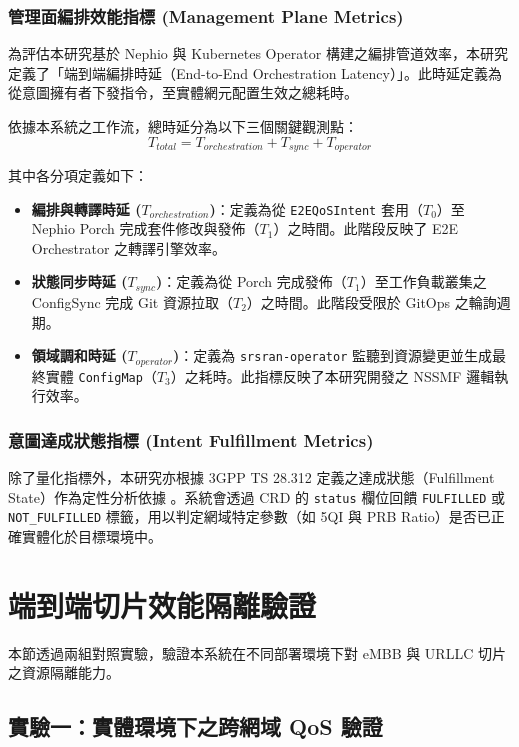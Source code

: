 \subsubsection{管理面編排效能指標 (Management Plane Metrics)}
為評估本研究基於 Nephio 與 Kubernetes Operator 構建之編排管道效率，本研究定義了「端到端編排時延（End-to-End Orchestration Latency）」。此時延定義為從意圖擁有者下發指令，至實體網元配置生效之總耗時。

依據本系統之工作流，總時延分為以下三個關鍵觀測點：
\begin{equation}
    T_{total} = T_{orchestration} + T_{sync} + T_{operator}
\end{equation}

其中各分項定義如下：
\begin{itemize}
    \item \textbf{編排與轉譯時延 ($T_{orchestration}$)}：定義為從 \texttt{E2EQoSIntent} 套用（$T_0$）至 Nephio Porch 完成套件修改與發佈（$T_1$）之時間。此階段反映了 E2E Orchestrator 之轉譯引擎效率。
    \item \textbf{狀態同步時延 ($T_{sync}$)}：定義為從 Porch 完成發佈（$T_1$）至工作負載叢集之 ConfigSync 完成 Git 資源拉取（$T_2$）之時間。此階段受限於 GitOps 之輪詢週期。
    \item \textbf{領域調和時延 ($T_{operator}$)}：定義為 \texttt{srsran-operator} 監聽到資源變更並生成最終實體 \texttt{ConfigMap}（$T_3$）之耗時。此指標反映了本研究開發之 NSSMF 邏輯執行效率。
\end{itemize}

\subsubsection{意圖達成狀態指標 (Intent Fulfillment Metrics)}
除了量化指標外，本研究亦根據 3GPP TS 28.312 定義之達成狀態（Fulfillment State）作為定性分析依據 。系統會透過 CRD 的 \texttt{status} 欄位回饋 \texttt{FULFILLED} 或 \texttt{NOT\_FULFILLED} 標籤，用以判定網域特定參數（如 5QI 與 PRB Ratio）是否已正確實體化於目標環境中。

\section{端到端切片效能隔離驗證}
\label{sec:slice_performance}
本節透過兩組對照實驗，驗證本系統在不同部署環境下對 eMBB 與 URLLC 切片之資源隔離能力。

\subsection{實驗一：實體環境下之跨網域 QoS 驗證}
\label{subsec:local_qos_verification}

